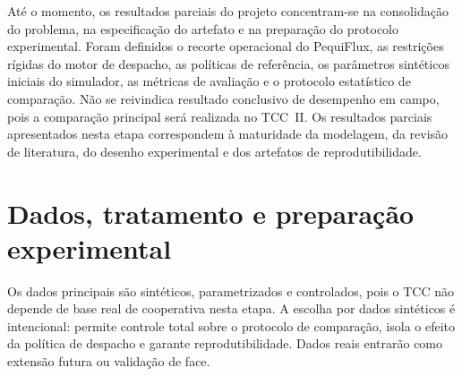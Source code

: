 \documentclass[
  12pt,
  oneside,
  a4paper,
  sumario=tradicional,
  brazil
]{abntex2}
\begin{document}
At\'e o momento, os resultados parciais do projeto concentram-se na consolida\c{c}\~ao do problema, na especifica\c{c}\~ao do artefato e na prepara\c{c}\~ao do protocolo experimental. Foram definidos o recorte operacional do PequiFlux, as restri\c{c}\~oes r\'igidas do motor de despacho, as pol\'iticas de refer\^encia, os par\^ametros sint\'eticos iniciais do simulador, as m\'etricas de avalia\c{c}\~ao e o protocolo estat\'istico de compara\c{c}\~ao. N\~ao se reivindica resultado conclusivo de desempenho em campo, pois a compara\c{c}\~ao principal ser\'a realizada no TCC~II. Os resultados parciais apresentados nesta etapa correspondem \`a maturidade da modelagem, da revis\~ao de literatura, do desenho experimental e dos artefatos de reprodutibilidade.

\section{Dados, tratamento e prepara\c{c}\~ao experimental}

Os dados principais s\~ao sint\'eticos, parametrizados e controlados, pois o TCC n\~ao depende de base real de cooperativa nesta etapa. A escolha por dados sint\'eticos \'e intencional: permite controle total sobre o protocolo de compara\c{c}\~ao, isola o efeito da pol\'itica de despacho e garante reprodutibilidade. Dados reais entrar\~ao como extens\~ao futura ou valida\c{c}\~ao de face.
\end{document}
